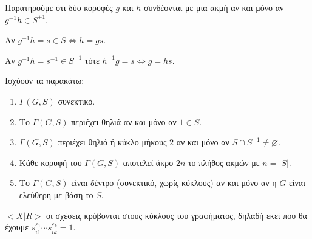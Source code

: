 \documentclass[oneside,a4paper]{article}
\begin{document}
\begin{figure}[ht]
	\centering
	\end{figure}

\noindent Παρατηρούμε ότι δύο κορυφές $g$ και $h$ συνδέονται με μια ακμή αν και μόνο αν $g^{-1}h \in S^{\pm 1}$.

\begin{figure}[ht]
	\centering
\end{figure}

\noindent Αν $g^{-1}h = s \in S \iff h = gs$.

\noindent Αν $g^{-1}h = s^{-1} \in S^{-1}$ τότε $h^{-1}g = s \iff g = hs$.

\noindent Ισχύουν τα παρακάτω:

\begin{enumerate}
	\item $\Gamma(G,S)$ συνεκτικό.
	\item Το $\Gamma(G,S)$ περιέχει θηλιά αν και μόνο αν $1 \in S$.
	\item $\Gamma(G,S)$ περιέχει θηλιά ή κύκλο μήκους $2$ αν και μόνο αν $S\cap S^{-1} \neq \varnothing$.
	\item Κάθε κορυφή του $\Gamma(G,S)$ αποτελεί άκρο $2n$ το πλήθος ακμών με $n = |S|$.
	\item Το $\Gamma(G,S)$ είναι δέντρο (συνεκτικό, χωρίς κύκλους) αν και μόνο αν η $G$ είναι ελεύθερη με βάση το $S$.
\end{enumerate}

\begin{figure}[ht]
	\centering
\end{figure}

\noindent $<X| R>$ οι σχέσεις κρύβονται στους κύκλους του γραφήματος, δηλαδή εκεί που θα έχουμε $s^{\varepsilon_1}_{i1} \cdots s^{\varepsilon_k}_{ik} = 1$.
\end{document}
